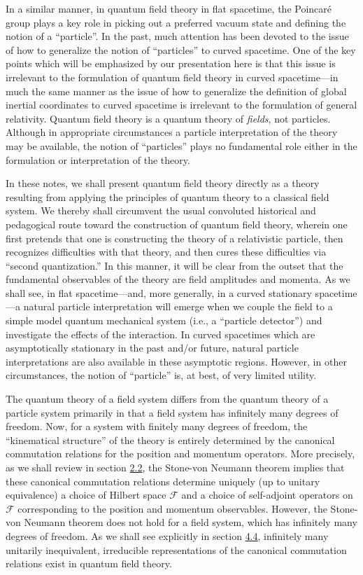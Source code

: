 \documentclass[11pt,a4paper]{article}
\begin{document}
In a similar manner, in quantum field theory in flat spacetime, the Poincaré group plays a key role in picking out a preferred vacuum state and defining the notion of a ``particle''. In the past, much attention has been devoted to the issue of how to generalize the notion of ``particles'' to curved spacetime. One of the key points which will be emphasized by our presentation here is that this issue is irrelevant to the formulation of quantum field theory in curved spacetime---in much the same manner as the issue of how to generalize the definition of global inertial coordinates to curved spacetime is irrelevant to the formulation of general relativity. Quantum field theory is a quantum theory of \emph{fields}, not particles. Although in appropriate circumstances a particle interpretation of the theory may be available, the notion of ``particles'' plays no fundamental role either in the formulation or interpretation of the theory.

In these notes, we shall present quantum field theory directly as a theory resulting from applying the principles of quantum theory to a classical field system. We thereby shall circumvent the usual convoluted historical and pedagogical route toward the construction of quantum field theory, wherein one first pretends that one is constructing the theory of a relativistic particle, then recognizes \hypertarget{source-16}{} difficulties with that theory, and then cures these difficulties via ``second quantization.'' In this manner, it will be clear from the outset that the fundamental observables of the theory are field amplitudes and momenta. As we shall see, in flat spacetime---and, more generally, in a curved stationary spacetime---a natural particle interpretation will emerge when we couple the field to a simple model quantum mechanical system (i.e., a ``particle detector'') and investigate the effects of the interaction. In curved spacetimes which are asymptotically stationary in the past and/or future, natural particle interpretations are also available in these asymptotic regions. However, in other circumstances, the notion of ``particle'' is, at best, of very limited utility.

The quantum theory of a field system differs from the quantum theory of a particle system primarily in that a field system has infinitely many degrees of freedom. Now, for a system with finitely many degrees of freedom, the ``kinematical structure'' of the theory is entirely determined by the canonical commutation relations for the position and momentum operators. More precisely, as we shall review in section \hyperlink{sec:2.2}{2.2}, the Stone-von Neumann theorem implies that these canonical commutation relations determine uniquely (up to unitary equivalence) a choice of Hilbert space \(\mathcal{F}\) and a choice of self-adjoint operators on \(\mathcal{F}\) corresponding to the position and momentum observables. However, the Stone-von Neumann theorem does not hold for a field system, which has infinitely many degrees of freedom. As we shall see explicitly in section \hyperlink{sec:4.4}{4.4}, infinitely many unitarily inequivalent, irreducible representations of the canonical commutation relations exist in quantum field theory.
\end{document}
